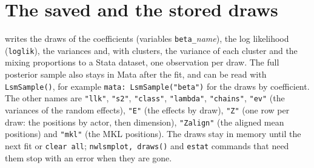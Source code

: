 \section{The saved and the stored draws}\label{sec:draws}

 writes the draws of the coefficients (variables \texttt{beta\_}\emph{name}), the log likelihood (\texttt{loglik}), the variances and, with clusters, the variance of each cluster and the mixing proportions to a Stata dataset, one observation per draw. The full posterior sample also stays in Mata after the fit, and can be read with \texttt{LsmSample()}, for example \texttt{mata: LsmSample("beta")} for the draws by coefficient. The other names are \texttt{"llk"}, \texttt{"s2"}, \texttt{"class"}, \texttt{"lambda"}, \texttt{"chains"}, \texttt{"ev"} (the variances of the random effects), \texttt{"E"} (the effects by draw), \texttt{"Z"} (one row per draw: the positions by actor, then dimension), \texttt{"Zalign"} (the aligned mean positions) and \texttt{"mkl"} (the MKL positions).
The draws stay in memory until the next fit or \texttt{clear all}; \texttt{nwlsmplot, draws()} and \texttt{estat} commands that need them stop with an error when they are gone.
